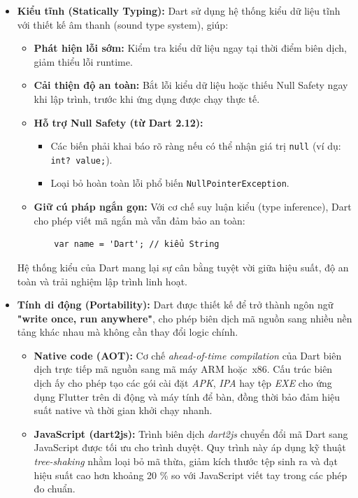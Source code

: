 \documentclass[../DoAn.tex]{subfiles}
\numberwithin{figure}{chapter}
\begin{document}
\begin{itemize}
\vspace{0.5cm}

\item \textbf{Kiểu tĩnh (Statically Typing):} 
Dart sử dụng hệ thống kiểu dữ liệu tĩnh với thiết kế âm thanh (sound type system), giúp:

\begin{itemize}
    \item \textbf{Phát hiện lỗi sớm:} Kiểm tra kiểu dữ liệu ngay tại thời điểm biên dịch, giảm thiểu lỗi runtime.
    \item \textbf{Cải thiện độ an toàn:} Bắt lỗi kiểu dữ liệu hoặc thiếu Null Safety ngay khi lập trình, trước khi ứng dụng được chạy thực tế.
    \item \textbf{Hỗ trợ Null Safety (từ Dart 2.12):}
    \begin{itemize}
        \item Các biến phải khai báo rõ ràng nếu có thể nhận giá trị \texttt{null} (ví dụ: \texttt{int? value;}).
        \item Loại bỏ hoàn toàn lỗi phổ biến \texttt{NullPointerException}.
    \end{itemize}
    \item \textbf{Giữ cú pháp ngắn gọn:} Với cơ chế suy luận kiểu (type inference), Dart cho phép viết mã ngắn mà vẫn đảm bảo an toàn:
    \begin{verbatim}
    var name = 'Dart'; // kiểu String
    \end{verbatim}
\end{itemize}

Hệ thống kiểu của Dart mang lại sự cân bằng tuyệt vời giữa hiệu suất, độ an toàn và trải nghiệm lập trình linh hoạt.

    \item \textbf{Tính di động (Portability):} 
Dart được thiết kế để trở thành ngôn ngữ \textbf{"write once, run anywhere"}, cho phép biên dịch mã nguồn sang nhiều nền tảng khác nhau mà không cần thay đổi logic chính.
\begin{itemize}
\item \textbf{Native code (AOT):} Cơ chế \textit{ahead-of-time compilation} của Dart biên dịch trực tiếp mã nguồn sang mã máy ARM hoặc~x86. Cấu trúc biên dịch ấy cho phép tạo các gói cài đặt \textit{APK}, \textit{IPA} hay tệp \textit{EXE} cho ứng dụng Flutter trên di động và máy tính để bàn, đồng thời bảo đảm hiệu suất native và thời gian khởi chạy nhanh.

\item \textbf{JavaScript (dart2js):} Trình biên dịch \textit{dart2js} chuyển đổi mã Dart sang JavaScript được tối ưu cho trình duyệt. Quy trình này áp dụng kỹ thuật \textit{tree-shaking} nhằm loại bỏ mã thừa, giảm kích thước tệp sinh ra và đạt hiệu suất cao hơn khoảng 20 \% so với JavaScript viết tay trong các phép đo chuẩn.


\end{itemize}
\end{itemize}
\end{document}

